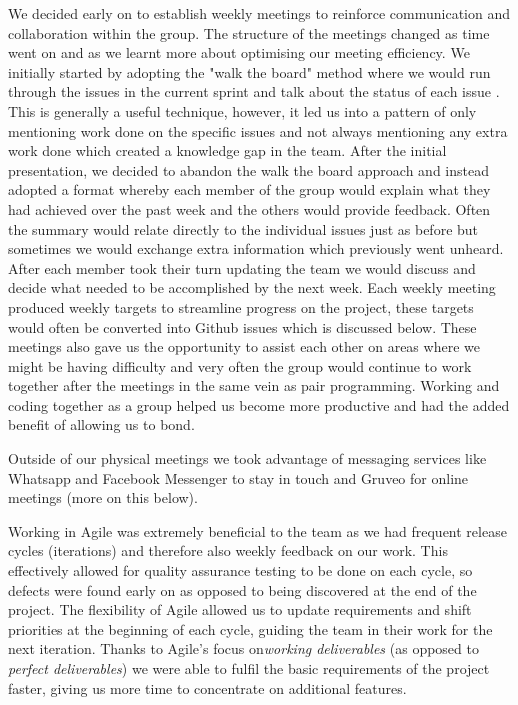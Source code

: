 \documentclass[a4paper]{report}
\begin{document}
	We decided early on to establish weekly meetings to reinforce communication and collaboration within the group. The structure of the meetings changed as time went on and as we learnt more about optimising our meeting efficiency. We initially started by adopting the "walk the board" method where we would run through the issues in the current sprint and talk about the status of each issue \cite{schlabach_agile_2009}. This is generally a useful technique, however, it led us into a pattern of only mentioning work done on the specific issues and not always mentioning any extra work done which created a knowledge gap in the team. After the initial presentation, we decided to abandon the walk the board approach and instead adopted a format whereby each member of the group would explain what they had achieved over the past week and the others would provide feedback. Often the summary would relate directly to the individual issues just as before but sometimes we would exchange extra information which previously went unheard. After each member took their turn updating the team we would discuss and decide what needed to be accomplished by the next week. Each weekly meeting produced weekly targets to streamline progress on the project, these targets would often be converted into Github issues which is discussed below. These meetings also gave us the opportunity to assist each other on areas where we might be having difficulty and very often the group would continue to work together after the meetings in the same vein as pair programming. Working and coding together as a group helped us become more productive and had the added benefit of allowing us to bond.\newline
	\par Outside of our physical meetings we took advantage of messaging services like Whatsapp and Facebook Messenger to stay in touch and Gruveo for online meetings (more on this below).\newline
	
	\par Working in Agile was extremely beneficial to the team as we had frequent release cycles (iterations) and therefore also weekly feedback on our work. This effectively allowed for quality assurance testing to be done on each cycle, so defects were found early on as opposed to being discovered at the end of the project. The flexibility of Agile allowed us to update requirements and shift priorities at the beginning of each cycle, guiding the team in their work for the next iteration. Thanks to Agile's focus on\textit{working deliverables} (as opposed to \textit{perfect deliverables}) we were able to fulfil the basic requirements of the project faster, giving us more time to concentrate on additional features.\newline
	
\end{document}
